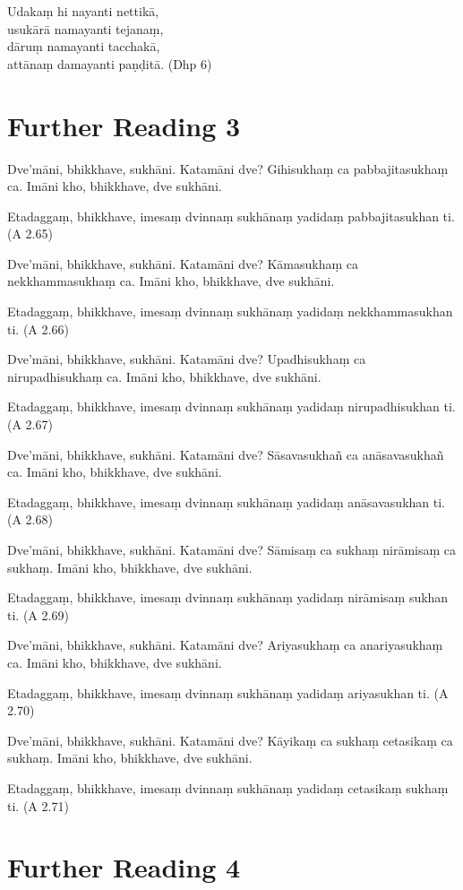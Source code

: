 Udakaṃ hi nayanti nettikā,\\
usukārā namayanti tejanaṃ,\\
dāruṃ namayanti tacchakā,\\
attānaṃ damayanti paṇḍitā. (Dhp 6)

\section*{Further Reading 3}

Dve’māni, bhikkhave, sukhāni. Katamāni dve? Gihisukhaṃ ca pabbajitasukhaṃ ca. Imāni kho, bhikkhave, dve sukhāni.

Etadaggaṃ, bhikkhave, imesaṃ dvinnaṃ sukhānaṃ yadidaṃ pabbajitasukhan ti. (A 2.65)

Dve’māni, bhikkhave, sukhāni. Katamāni dve? Kāmasukhaṃ ca nekkhammasukhaṃ ca. Imāni kho, bhikkhave, dve sukhāni.

Etadaggaṃ, bhikkhave, imesaṃ dvinnaṃ sukhānaṃ yadidaṃ nekkhammasukhan ti. (A 2.66)

Dve’māni, bhikkhave, sukhāni. Katamāni dve? Upadhisukhaṃ ca nirupadhisukhaṃ ca. Imāni kho, bhikkhave, dve sukhāni.

Etadaggaṃ, bhikkhave, imesaṃ dvinnaṃ sukhānaṃ yadidaṃ nirupadhisukhan ti. (A 2.67)

Dve’māni, bhikkhave, sukhāni. Katamāni dve? Sāsavasukhañ ca anāsavasukhañ ca. Imāni kho, bhikkhave, dve sukhāni.

Etadaggaṃ, bhikkhave, imesaṃ dvinnaṃ sukhānaṃ yadidaṃ anāsavasukhan ti. (A 2.68)

Dve’māni, bhikkhave, sukhāni. Katamāni dve? Sāmisaṃ ca sukhaṃ nirāmisaṃ ca sukhaṃ. Imāni kho, bhikkhave, dve sukhāni.

Etadaggaṃ, bhikkhave, imesaṃ dvinnaṃ sukhānaṃ yadidaṃ nirāmisaṃ sukhan ti. (A 2.69)

Dve’māni, bhikkhave, sukhāni. Katamāni dve? Ariyasukhaṃ ca anariyasukhaṃ ca. Imāni kho, bhikkhave, dve sukhāni.

Etadaggaṃ, bhikkhave, imesaṃ dvinnaṃ sukhānaṃ yadidaṃ ariyasukhan ti. (A 2.70)

Dve’māni, bhikkhave, sukhāni. Katamāni dve? Kāyikaṃ ca sukhaṃ cetasikaṃ ca sukhaṃ. Imāni kho, bhikkhave, dve sukhāni.

Etadaggaṃ, bhikkhave, imesaṃ dvinnaṃ sukhānaṃ yadidaṃ cetasikaṃ sukhaṃ ti. (A 2.71)

\section*{Further Reading 4}

